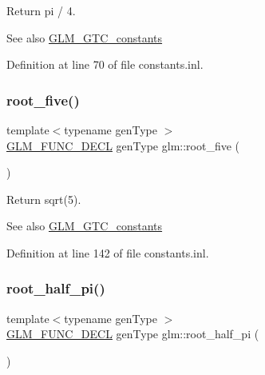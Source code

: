 Return pi / 4. \begin{DoxySeeAlso}{See also}
\hyperlink{group__gtc__constants}{G\+L\+M\+\_\+\+G\+T\+C\+\_\+constants} 
\end{DoxySeeAlso}


Definition at line 70 of file constants.\+inl.

\mbox{\label{group__gtc__constants_gace2b8dfed1ab9fabbb67dde08e7e5b58}} 
\subsubsection{\texorpdfstring{root\+\_\+five()}{root\_five()}}
{\footnotesize\ttfamily template$<$typename gen\+Type $>$ \\
\hyperlink{setup_8hpp_ab2d052de21a70539923e9bcbf6e83a51}{G\+L\+M\+\_\+\+F\+U\+N\+C\+\_\+\+D\+E\+CL} gen\+Type glm\+::root\+\_\+five (\begin{DoxyParamCaption}{ }\end{DoxyParamCaption})}

Return sqrt(5). \begin{DoxySeeAlso}{See also}
\hyperlink{group__gtc__constants}{G\+L\+M\+\_\+\+G\+T\+C\+\_\+constants} 
\end{DoxySeeAlso}


Definition at line 142 of file constants.\+inl.

\mbox{\label{group__gtc__constants_gaec5af85e2148c118aad7e797430fdeb0}} 
\subsubsection{\texorpdfstring{root\+\_\+half\+\_\+pi()}{root\_half\_pi()}}
{\footnotesize\ttfamily template$<$typename gen\+Type $>$ \\
\hyperlink{setup_8hpp_ab2d052de21a70539923e9bcbf6e83a51}{G\+L\+M\+\_\+\+F\+U\+N\+C\+\_\+\+D\+E\+CL} gen\+Type glm\+::root\+\_\+half\+\_\+pi (\begin{DoxyParamCaption}{ }\end{DoxyParamCaption})}

